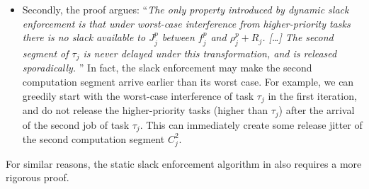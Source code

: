\begin{itemize}
\begin{itemize}
  \item Secondly, the proof argues: ``\emph{The only property
      introduced by dynamic slack enforcement is that under worst-case
      interference from higher-priority tasks there is no slack
      available to $J_j^p$ between $f_j^p$ and $\rho_j^p + R_j$.
      \emph{[\ldots]} The second segment of $\tau_j$ is never delayed under
      this transformation, and is released sporadically.} '' In fact,
    the slack enforcement may make the second computation segment
    arrive earlier than its worst case. For example, we can greedily
    start with the worst-case interference of task $\tau_j$ in the
    first iteration, and do not release the higher-priority tasks
    (higher than $\tau_j$) after the arrival of the second job of task
    $\tau_j$. This can immediately create some release jitter of the
    second computation segment $C_j^2$.
  \end{itemize}
  For similar reasons, the static slack enforcement algorithm in
  \cite{LR:rtas10} also requires a more rigorous proof.
\end{itemize}

\label{sec:correct-solutions} 

